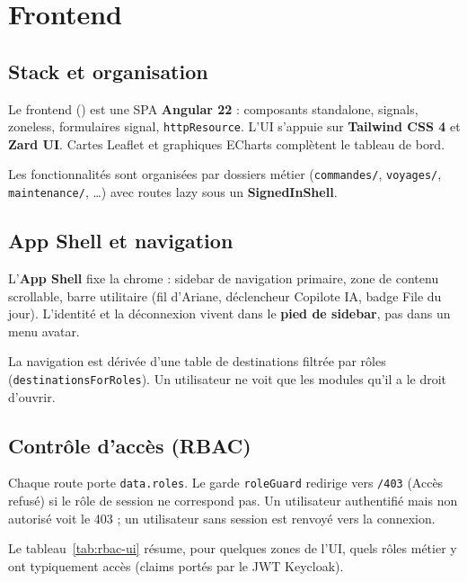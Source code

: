 \chapter{Frontend}
\label{chap:frontend}

\section{Stack et organisation}

Le frontend () est une SPA \textbf{Angular 22} : composants standalone, signals, zoneless, formulaires signal, \texttt{httpResource}. L'UI s'appuie sur \textbf{Tailwind CSS 4} et \textbf{Zard UI}. Cartes Leaflet et graphiques ECharts complètent le tableau de bord.

Les fonctionnalités sont organisées par dossiers métier (\texttt{commandes/}, \texttt{voyages/}, \texttt{maintenance/}, \ldots) avec routes lazy sous un \textbf{SignedInShell}.

\section{App Shell et navigation}

L'\textbf{App Shell} fixe la chrome : sidebar de navigation primaire, zone de contenu scrollable, barre utilitaire (fil d'Ariane, déclencheur Copilote IA, badge File du jour). L'identité et la déconnexion vivent dans le \textbf{pied de sidebar}, pas dans un menu avatar.

La navigation est dérivée d'une table de destinations filtrée par rôles (\texttt{destinationsForRoles}). Un utilisateur ne voit que les modules qu'il a le droit d'ouvrir.

\section{Contrôle d'accès (RBAC)}

Chaque route porte \texttt{data.roles}. Le garde \texttt{roleGuard} redirige vers
\texttt{/403} (Accès refusé) si le rôle de session ne correspond pas. Un utilisateur
authentifié mais non autorisé voit le 403 ; un utilisateur sans session est renvoyé
vers la connexion.

Le tableau~\ref{tab:rbac-ui} résume, pour quelques zones de l'UI, quels rôles métier
y ont typiquement accès (claims portés par le JWT Keycloak).

